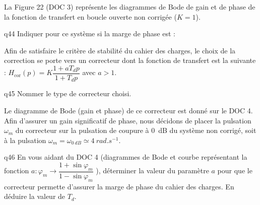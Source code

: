 \begin{multicols}{2}
La Figure 22 (DOC 3) représente les diagrammes de Bode de gain et de phase de la fonction de transfert en boucle ouverte non corrigée ($K=1$).


{\begin{question}{q44}
Indiquer pour ce système si la marge de phase est :
\ifprof
\begin{corrige}
\end{corrige}
\else
\fi
\begin{reponses}
\end{reponses} \end{question}}  

Afin de satisfaire le critère de stabilité du cahier des charges, le choix de la correction se porte vers un correcteur dont la fonction de transfert est la suivante : $H_{\text{cor}}(p)
=K\dfrac{1+aT_dp}{1+T_dp}$ avec $a>1$.

{\begin{question}{q45}
Nommer le type de correcteur choisi.
\ifprof
\begin{corrige}

\end{corrige}
\else
\fi
\begin{reponses}
\end{reponses} \end{question}}  

Le diagramme de Bode (gain et phase) de ce correcteur est donné sur le DOC 4. Afin d'assurer un gain significatif de phase, nous décidons de placer la pulsation $\omega_m$ du correcteur sur la pulsation de coupure à \SI{0}{dB} du système non corrigé, soit à la pulsation $\omega_m = \omega_{\SI{0}{dB}}\simeq \SI{4}{rad.s^{-1}}$.


{\begin{question}{q46}
En vous aidant du DOC 4 (diagrammes de Bode et courbe représentant la fonction
$a:\varphi_m \to \dfrac{1+\sin\varphi_m}{1-\sin\varphi_m}$ ), déterminer la valeur du paramètre $a$ pour que le correcteur permette d'assurer
la marge de phase du cahier des charges. En déduire la valeur de $T_d$.
\ifprof
\begin{corrige}
\end{corrige}
\else
\fi
\begin{reponses}
\end{reponses} \end{question}}  



\end{multicols}
